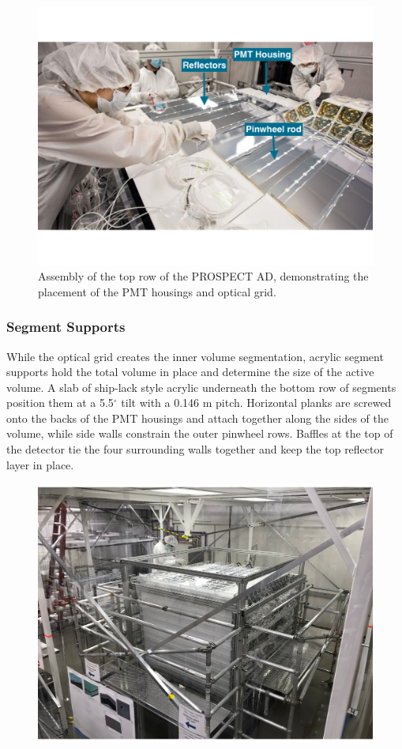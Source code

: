 \begin{figure}[]
	\centering
	\includegraphics[width=0.7\linewidth]{tex/4-prospect-images/RowAssembly}
	\caption[Construction of a row]{Assembly of the top row of the PROSPECT AD, demonstrating the placement of the PMT housings and optical grid.}
	\label{fig:rowassembly}
\end{figure}


\subsubsection{Segment Supports}

While the optical grid creates the inner volume segmentation, acrylic segment supports hold the total volume in place and determine the size of the active volume.
A slab of ship-lack style acrylic underneath the bottom row of segments position them at a 5.5$^{\circ}$ tilt with a 0.146 m pitch.
Horizontal planks are screwed onto the backs of the PMT housings and attach together along the sides of the volume, while side walls constrain the outer pinwheel rows. 
Baffles at the top of the detector tie the four surrounding walls together and keep the top reflector layer in place. 



\begin{figure}[h]
	\centering
	\includegraphics[width=0.7\linewidth]{tex/4-prospect-images/CompletedDetector}
	\caption{}
	\label{fig:completeddetector}
\end{figure}


